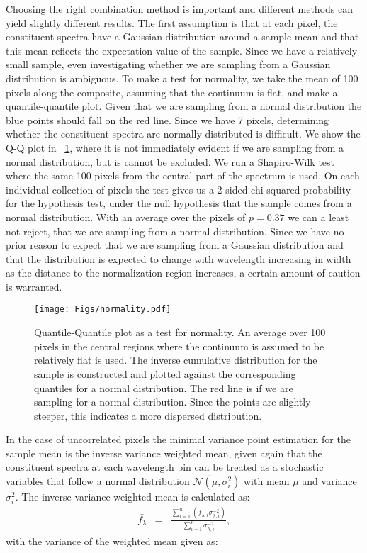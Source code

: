 \documentclass{aa}    %
\newcommand{\figref}[1]{\ref{fig:#1}}
\newcommand{\Fig}[1]{\figurename~\figref{#1}}
\newcommand{\fig}[1]{\Fig{#1}}
\newcommand{\figlabel}[1]{\label{fig:#1}}
\newcommand{\eqlabel}[1]{\label{eq:#1}}
\begin{document}
Choosing the right combination method is important and different methods can yield slightly different results. The first assumption is that at each pixel, the constituent spectra have a Gaussian distribution around a sample mean and that this mean reflects the expectation value of the sample. Since we have a relatively small sample, even investigating whether we are sampling from a Gaussian distribution is ambiguous. To make a test for normality, we take the mean of 100 pixels along the composite, assuming that the continuum is flat, and make a quantile-quantile plot. Given that we are sampling from a normal distribution the blue points should fall on the red line. Since we have 7 pixels, determining whether the constituent spectra are normally distributed is difficult. We show the Q-Q plot in \fig{normality}, where it is not immediately evident if we are sampling from a normal distribution, but is cannot be excluded. We run a Shapiro-Wilk test where the same 100 pixels from the central part of the spectrum is used. On each individual collection of pixels the test gives us a 2-sided chi squared probability for the hypothesis test, under the null hypothesis that the sample comes from a normal distribution. With an average over the pixels of $p = 0.37$ we can a least not reject, that we are sampling from a normal distribution. Since we have no prior reason to expect that we are sampling from a Gaussian distribution and that the distribution is expected to change with wavelength increasing in width as the distance to the normalization region increases, a certain amount of caution is warranted. 

\begin{figure}[t!]
  \centering
  \texttt{[image: Figs/normality.pdf]}
  \caption[]{Quantile-Quantile plot as a test for normality. An average over 100 pixels in the central regions where the continuum is assumed to be relatively flat is used. The inverse cumulative distribution for the sample is constructed and plotted against the corresponding quantiles for a normal distribution. The red line is if we are sampling for a normal distribution. Since the points are slightly steeper, this indicates a more dispersed distribution.}
 \figlabel{normality}
\end{figure}

In the case of uncorrelated pixels the minimal variance point estimation for the sample mean is the inverse variance weighted mean, given again that the constituent spectra at each wavelength bin can be treated as a stochastic variables that follow a normal distribution $\mathcal{N}(\mu, \sigma_i^2)$ with mean $\mu$ and variance $\sigma_i^2$. The inverse variance weighted mean is calculated as:
\begin{eqnarray} \eqlabel{wmean}
\bar{f_{\lambda}} &=& \frac{ \sum_{i=1}^n \left( f_{\lambda, i} \sigma_{\lambda, i}^{-2} \right)}{\sum_{i=1}^n \sigma_{\lambda, i}^{-2}},
\end{eqnarray}
with the variance of the weighted mean given as: 
\end{document}
